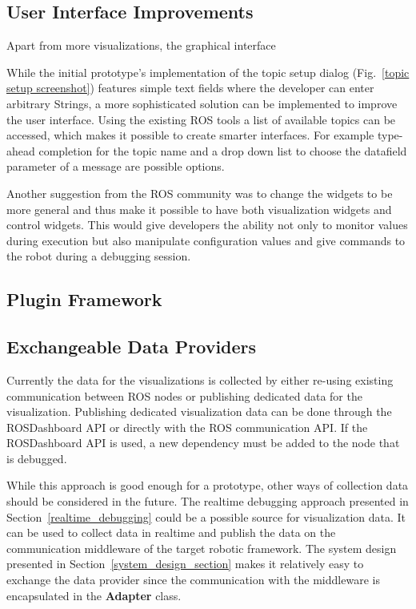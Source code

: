 \subsection{User Interface Improvements}
Apart from more visualizations, the graphical interface 

 While the initial prototype's implementation of the topic setup dialog (Fig.~\ref{topic setup screenshot}) features simple text fields where the developer can enter arbitrary Strings, a more sophisticated solution can be implemented to improve the user interface. Using the existing ROS tools a list of available topics can be accessed, which makes it possible to create smarter interfaces. For example type-ahead completion for the topic name and a drop down list to choose the datafield parameter of a message are possible options.

Another suggestion from the ROS community was to change the widgets to be more general and thus make it possible to have both visualization widgets and control widgets. This would give developers the ability not only to monitor values during execution but also manipulate configuration values and give commands to the robot during a debugging session.

\subsection{Plugin Framework}


\subsection{Exchangeable Data Providers}
Currently the data for the visualizations is collected by either re-using existing communication between ROS nodes or publishing dedicated data for the visualization. Publishing dedicated visualization data can be done through the ROSDashboard API or directly with the ROS communication API. If the ROSDashboard API is used, a new dependency must be added to the node that is debugged.

While this approach is good enough for a prototype, other ways of collection data should be considered in the future. The realtime debugging approach presented in Section~\ref{realtime_debugging} could be a possible source for visualization data. It can be used to collect data in realtime and publish the data on the communication middleware of the target robotic framework. The system design presented in Section~\ref{system_design_section} makes it relatively easy to exchange the data provider since the communication with the middleware is encapsulated in the \textbf{Adapter} class.

